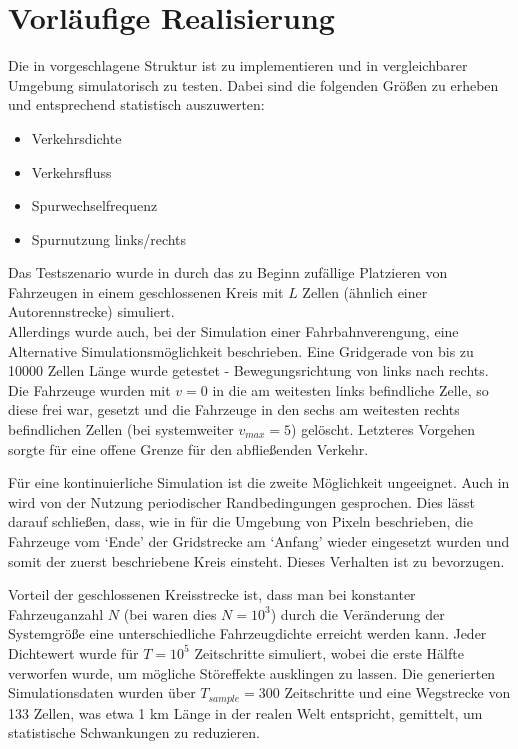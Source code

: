 \section{Vorläufige Realisierung}
\label{sec:realisierung}


\noindent
Die in \cite{dat-ba} vorgeschlagene Struktur ist zu implementieren und in vergleichbarer Umgebung simulatorisch zu testen. 
Dabei sind die folgenden Größen zu erheben und entsprechend statistisch auszuwerten: 

\begin{itemize}
\item Verkehrsdichte
\item Verkehrsfluss
\item Spurwechselfrequenz
\item Spurnutzung links/rechts
\end{itemize}

Das Testszenario wurde in \cite{na-sch} durch das zu Beginn zufällige Platzieren von Fahrzeugen in einem geschlossenen Kreis mit $L$ Zellen (ähnlich einer Autorennstrecke) simuliert. \\
Allerdings wurde auch, bei der Simulation einer Fahrbahnverengung, eine Alternative Simulationsmöglichkeit beschrieben. 
Eine Gridgerade von bis zu 10000 Zellen Länge wurde getestet - Bewegungsrichtung von links nach rechts. 
Die Fahrzeuge wurden mit $v=0$ in die am weitesten links befindliche Zelle, so diese frei war, gesetzt und die Fahrzeuge in den sechs am weitesten rechts befindlichen Zellen (bei systemweiter $v_{max}=5$) gelöscht. 
Letzteres Vorgehen sorgte für eine offene Grenze für den abfließenden Verkehr.

Für eine kontinuierliche Simulation ist die zweite Möglichkeit ungeeignet. 
Auch in \cite{multi-lane} wird von der Nutzung periodischer Randbedingungen gesprochen. 
Dies lässt darauf schließen, dass, wie in \cite[Abb. 1.5]{peri-rand} für die Umgebung von Pixeln beschrieben, die Fahrzeuge vom \enquote*{Ende} der Gridstrecke am \enquote*{Anfang} wieder eingesetzt wurden und somit der zuerst beschriebene Kreis einsteht.
Dieses Verhalten ist zu bevorzugen.

Vorteil der geschlossenen Kreisstrecke ist, dass man bei konstanter Fahrzeuganzahl $N$ (bei \cite{multi-lane} waren dies $N = 10^{3}$) durch die Veränderung der Systemgröße eine unterschiedliche Fahrzeugdichte erreicht werden kann. 
Jeder Dichtewert wurde für $T = 10^{5}$ Zeitschritte simuliert, wobei die erste Hälfte verworfen wurde, um mögliche Störeffekte ausklingen zu lassen. 
Die generierten Simulationsdaten wurden über $T_{sample} = 300$ Zeitschritte und eine Wegstrecke von 133 Zellen, was etwa 1 km Länge in der realen Welt entspricht, gemittelt, um statistische Schwankungen zu reduzieren.

